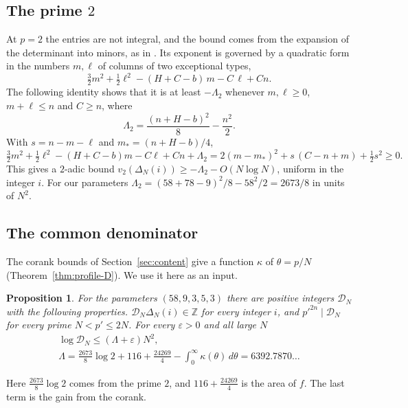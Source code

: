 \documentclass[11pt]{amsart}
\newcommand{\LamDen}{6392.7870}
\newtheorem{proposition}[theorem]{Proposition}
\theoremstyle{definition}
\theoremstyle{remark}
\numberwithin{equation}{section}
\newcommand{\Z}{\mathbb Z}
\newcommand{\cD}{\mathcal D}
\begin{document}
\subsection{The prime $2$}
At $p=2$ the entries are not integral, and the bound comes from the expansion of the determinant into
minors, as in \cite[\S3]{OpenAI2026}. Its exponent is governed by a quadratic form in the numbers $m,\ell$
of columns of two exceptional types,
\[
 \tfrac32m^2+\tfrac12\ell^2-(H+C-b)\,m-C\,\ell+Cn .
\]
The following identity shows that it is at least $-\Lambda_2$ whenever $m,\ell\ge0$, $m+\ell\le n$ and
$C\ge n$, where
\begin{equation}\label{eq:A2}
 \Lambda_2=\frac{(n+H-b)^2}8-\frac{n^2}2 .
\end{equation}
With $s=n-m-\ell$ and $m_*=(n+H-b)/4$,
\[
 \tfrac32m^2+\tfrac12\ell^2-(H+C-b)m-C\ell+Cn+\Lambda_2
 =2(m-m_*)^2+s\,(C-n+m)+\tfrac12s^2\ge0 .
\]
This gives a $2$-adic bound $v_2(\Delta_N(i))\ge-\Lambda_2-O(N\log N)$, uniform in the integer $i$. For our
parameters $\Lambda_2=(58+78-9)^2/8-58^2/2=2673/8$ in units of $N^2$.

\subsection{The common denominator}
The corank bounds of Section~\ref{sec:content} give a function $\kappa$ of $\theta=p/N$
(Theorem~\ref{thm:profile-D}). We use it here as an input.

\begin{proposition}\label{prop:denominators}
For the parameters $(58,9,3,5,3)$ there are positive integers $\cD_N$ with the following properties.
$\cD_N\Delta_N(i)\in\Z$ for every integer $i$, and $p'^{2n}\mid\cD_N$ for every prime $N<p'\le2N$. For every
$\varepsilon>0$ and all large $N$
\begin{gather*}
 \log\cD_N\le(\Lambda+\varepsilon)N^2,\\
 \Lambda=\frac{2673}8\log2+116+\frac{24269}4-\int_0^\infty\kappa(\theta)\,d\theta=\LamDen\ldots
\end{gather*}
\end{proposition}

Here $\frac{2673}8\log2$ comes from the prime $2$, and $116+\frac{24269}4$ is the area of $f$. The last term
is the gain from the corank.
\end{document}
